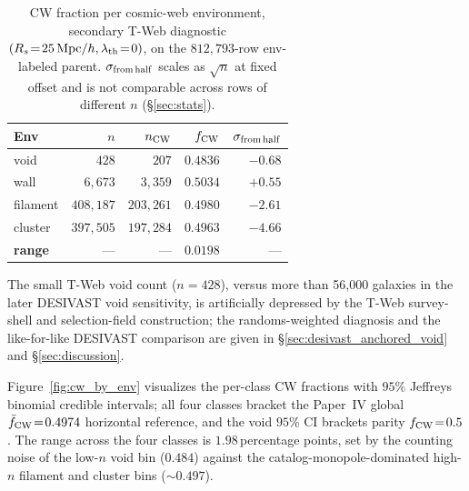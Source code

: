 \documentclass[twocolumn,linenumbers]{aastex702}
\begin{document}
\begin{table}[!htbp]
\caption{CW fraction per cosmic-web environment, secondary T-Web
diagnostic $(R_s\!=\!25\,{\rm Mpc}/h, \lambda_{\rm th}\!=\!0)$, on the
$812{,}793$-row env-labeled parent. $\sigma_{\rm from\,half}$ scales
as $\sqrt{n}$ at fixed offset and is not comparable across rows of
different $n$ (\S\ref{sec:stats}).}
\label{tab:cw_vs_env}
\begin{ruledtabular}
\begin{tabular}{lrrrr}
Env & $n$ & $n_{\rm CW}$ & $f_{\rm CW}$ & $\sigma_{\rm from\,half}$ \\
\hline
void & $428$ & $207$ & $0.4836$ & $-0.68$ \\
wall & $6{,}673$ & $3{,}359$ & $0.5034$ & $+0.55$ \\
filament & $408{,}187$ & $203{,}261$ & $0.4980$ & $-2.61$ \\
cluster & $397{,}505$ & $197{,}284$ & $0.4963$ & $-4.66$ \\
\hline
\textbf{range} & --- & --- & $\mathbf{0.0198}$ & --- \\
\end{tabular}
\end{ruledtabular}
\end{table}
The small T-Web void count ($n=428$), versus more than 56,000 galaxies
in the later DESIVAST void sensitivity, is artificially depressed by the
T-Web survey-shell and selection-field construction; the randoms-weighted
diagnosis and the like-for-like DESIVAST comparison are given in
\S\ref{sec:desivast_anchored_void} and \S\ref{sec:discussion}.

Figure~\ref{fig:cw_by_env} visualizes the per-class CW fractions with
$95\%$ Jeffreys binomial credible intervals; all four classes bracket
the Paper~IV global $\bar f_{\rm CW}\!=\!0.4974$ horizontal reference,
and the void $95\%$ CI brackets parity $f_{\rm CW}\!=\!0.5$. The
range across the four classes is $1.98$\,percentage points, set by
the counting noise of the low-$n$ void bin ($0.484$) against the
catalog-monopole-dominated high-$n$ filament and cluster bins
($\sim 0.497$).
\end{document}
